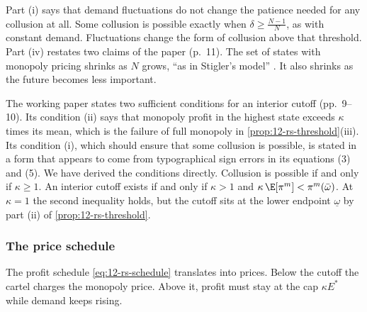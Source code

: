 Part (i) says that demand fluctuations do not change the patience needed for any collusion at all. Some collusion is
possible exactly when $\delta \ge \frac{N-1}{N}$, as with constant demand. Fluctuations change the form of collusion
above that threshold. Part (iv) restates two claims of the paper (p.~11). The set of states with monopoly pricing
shrinks as $N$ grows, ``as in Stigler's model'' \citep{Stigler1964}. It also shrinks as the future becomes less
important.

\begin{remark}\label{rem:12-rs-wp}
The working paper states two sufficient conditions for an interior cutoff (pp.~9--10). Its condition (ii) says that
monopoly profit in the highest state exceeds $\kappa$ times its mean, which is the failure of full monopoly in
\cref{prop:12-rs-threshold}(iii). Its condition (i), which should ensure that some collusion is possible, is stated in
a form that appears to come from typographical sign errors in its equations (3) and (5). We have derived the
conditions directly. Collusion is possible if and only if $\kappa \ge 1$. An interior cutoff exists if and only if
$\kappa > 1$ and $\kappa\,\E[\pi^m] < \pi^m(\bar\omega)$. At $\kappa = 1$ the second inequality holds, but the
cutoff sits at the lower endpoint $\underline\omega$ by part (ii) of \cref{prop:12-rs-threshold}.
\end{remark}

\subsubsection{The price schedule}

The profit schedule \eqref{eq:12-rs-schedule} translates into prices. Below the cutoff the cartel charges the monopoly
price. Above it, profit must stay at the cap $\kappa E^*$ while demand keeps rising.


